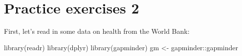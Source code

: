 \documentclass[
]{book}
\newenvironment{Shaded}{\begin{snugshade}}{\end{snugshade}}
\newcommand{\FunctionTok}[1]{\textcolor[rgb]{0.00,0.00,0.00}{#1}}
\newcommand{\NormalTok}[1]{#1}
\newcommand{\OtherTok}[1]{\textcolor[rgb]{0.56,0.35,0.01}{#1}}
\newcommand{\SpecialCharTok}[1]{\textcolor[rgb]{0.00,0.00,0.00}{#1}}
\begin{document}
\hypertarget{practice-exercises-2}{%
\section*{Practice exercises 2}\label{practice-exercises-2}}

First, let's read in some data on health from the World Bank:

\begin{Shaded}
\begin{Highlighting}[]
\FunctionTok{library}\NormalTok{(readr)}
\FunctionTok{library}\NormalTok{(dplyr)}
\FunctionTok{library}\NormalTok{(gapminder)}
\NormalTok{gm }\OtherTok{\textless{}{-}}\NormalTok{ gapminder}\SpecialCharTok{::}\NormalTok{gapminder}
\end{Highlighting}
\end{Shaded}
\end{document}
